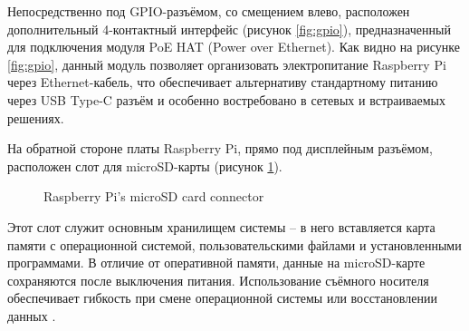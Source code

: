 Непосредственно под GPIO-разъёмом, со смещением влево, расположен дополнительный 4-контактный интерфейс (рисунок \ref{fig:gpio}), предназначенный для подключения модуля PoE HAT (Power over Ethernet). Как видно на рисунке \ref{fig:gpio}, данный модуль позволяет организовать электропитание Raspberry Pi через Ethernet-кабель, что обеспечивает альтернативу стандартному питанию через USB Type-C разъём и особенно востребовано в сетевых и встраиваемых решениях.

На обратной стороне платы Raspberry Pi, прямо под дисплейным разъёмом, расположен слот для microSD-карты (рисунок \ref{fig:microSd}).

\begin{figure}[H]
	\centering
	\caption{Raspberry Pi’s microSD card connector}
	\label{fig:microSd}
\end{figure}

Этот слот служит основным хранилищем системы -- в него вставляется карта памяти с операционной системой, пользовательскими файлами и установленными программами. В отличие от оперативной памяти, данные на microSD-карте сохраняются после выключения питания. Использование съёмного носителя обеспечивает гибкость при смене операционной системы или восстановлении данных \cite{RaspberryPi}.
\newpage
